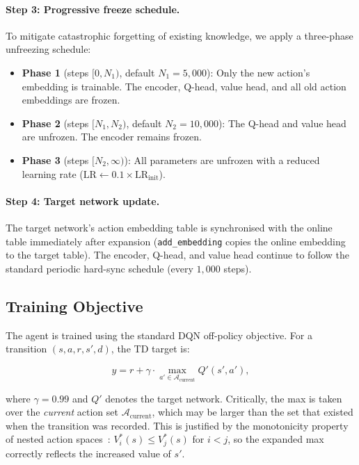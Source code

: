\documentclass{article}
\begin{document}
\paragraph{Step 3: Progressive freeze schedule.} To mitigate catastrophic
forgetting of existing knowledge, we apply a three-phase unfreezing schedule:

\begin{itemize}[nosep]
  \item \textbf{Phase 1} (steps $[0, N_1)$, default $N_1=5{,}000$): Only the
  new action's embedding is trainable. The encoder, Q-head, value head, and
  all old action embeddings are frozen.
  \item \textbf{Phase 2} (steps $[N_1, N_2)$, default $N_2=10{,}000$): The
  Q-head and value head are unfrozen. The encoder remains frozen.
  \item \textbf{Phase 3} (steps $[N_2, \infty)$): All parameters are unfrozen
  with a reduced learning rate ($\text{LR} \leftarrow 0.1 \times
  \text{LR}_\text{init}$).
\end{itemize}

\paragraph{Step 4: Target network update.} The target network's action
embedding table is synchronised with the online table immediately after
expansion (\texttt{add\_embedding} copies the online embedding to the target
table). The encoder, Q-head, and value head continue to follow the standard
periodic hard-sync schedule (every $1{,}000$ steps).

\subsection{Training Objective}

The agent is trained using the standard DQN off-policy objective. For a
transition $(s, a, r, s', d)$, the TD target is:

\begin{equation}
y = r + \gamma \cdot \max_{a' \in \mathcal{A}_\text{current}} Q'(s', a'),
\label{eq:td_target}
\end{equation}

where $\gamma=0.99$ and $Q'$ denotes the target network. Critically, the max
is taken over the \emph{current} action set $\mathcal{A}_\text{current}$, which
may be larger than the set that existed when the transition was recorded. This
is justified by the monotonicity property of nested action
spaces~\cite{farquhar2020growing}: $V^*_i(s) \leq V^*_j(s)$ for $i < j$, so
the expanded max correctly reflects the increased value of $s'$.
\end{document}
